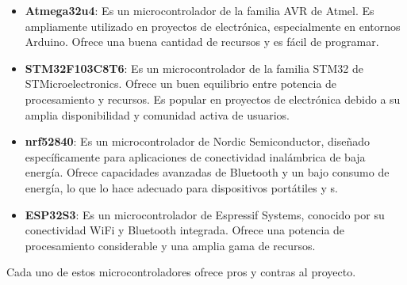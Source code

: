 \begin{itemize}
    \item \textbf{Atmega32u4}: Es un microcontrolador de la familia AVR de Atmel. Es ampliamente utilizado en proyectos de electrónica, especialmente en entornos \gls{Arduino}. Ofrece una buena cantidad de recursos y es fácil de programar.
    
    \item \textbf{STM32F103C8T6}: Es un microcontrolador de la familia STM32 de STMicroelectronics. Ofrece un buen equilibrio entre potencia de procesamiento y recursos. Es popular en proyectos de electrónica debido a su amplia disponibilidad y comunidad activa de usuarios.
    
    \item \textbf{nrf52840}: Es un microcontrolador de Nordic Semiconductor, diseñado específicamente para aplicaciones de conectividad inalámbrica de baja energía. Ofrece capacidades avanzadas de \gls{Bluetooth} y un bajo consumo de energía, lo que lo hace adecuado para dispositivos portátiles y s.
    
    \item \textbf{ESP32S3}: Es un microcontrolador de Espressif Systems, conocido por su conectividad \gls{WiFi} y \gls{Bluetooth} integrada. Ofrece una potencia de procesamiento considerable y una amplia gama de recursos.
\end{itemize}
Cada uno de estos microcontroladores ofrece pros y contras al proyecto.
\newpage
